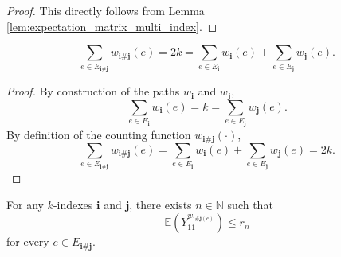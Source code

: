 \begin{proof}
  This directly follows from Lemma \ref{lem:expectation_matrix_multi_index}.
\end{proof}
\begin{lemma}
  \notready
  \label{lem:sum_count_edge_pair_eq_length_add_length} 
  \[
  \sum_{e \in E_{\mathbf{i} \# \mathbf{j}}} w_{\mathbf{i} \# \mathbf{j}}(e) 
  = 2k 
  = \sum_{e \in E_\mathbf{i}} w_{\mathbf{i}}(e) + \sum_{e \in E_\mathbf{j}} w_{\mathbf{j}}(e).
  \]
\end{lemma}
\begin{proof}
  By construction of the paths $w_\mathbf{i}$ and $w_\mathbf{j}$,
  \[
  \sum_{e \in E_\mathbf{i}} w_{\mathbf{i}}(e) = k = \sum_{e \in E_\mathbf{j}} w_{\mathbf{j}}(e).
  \]
  By definition of the counting function $w_{\mathbf{i} \# \mathbf{j}}(\cdot)$,
  \[
  \sum_{e \in E_{\mathbf{i} \# \mathbf{j}}} w_{\mathbf{i} \# \mathbf{j}}(e)  
  = \sum_{e \in E_\mathbf{i}} w_{\mathbf{i}}(e) + \sum_{e \in E_\mathbf{j}} w_{\mathbf{j}}(e)
  = 2k.
  \]
\end{proof}
\begin{lemma} %
  \notready
  \label{lem:expect_pow_edge_count_pair_le} 
  For any $k$-indexes $\mathbf{i}$ and $\mathbf{j}$, there exists $n \in \mathbb{N}$ such that
  \[
  \mathbb{E} (Y_{11}^{w_{\mathbf{i} \# \mathbf{j} (e)}}) \leq r_n
  \]
  for every $e \in E_{\mathbf{i} \# \mathbf{j}}$.
\end{lemma}

